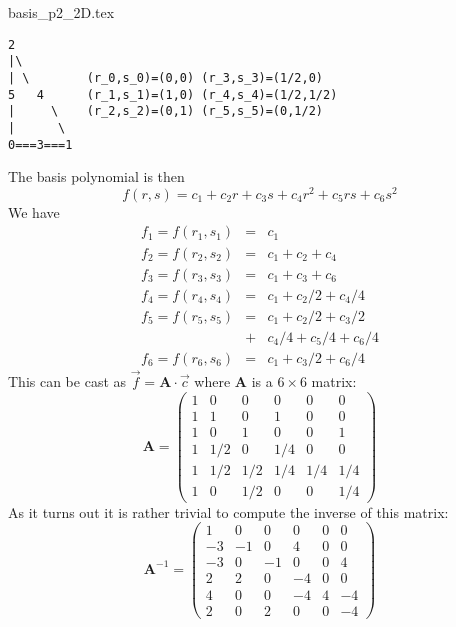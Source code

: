 \begin{flushright} {\tiny {\color{gray} basis\_p2\_2D.tex}} \end{flushright}


\begin{verbatim}
2            
|\
| \        (r_0,s_0)=(0,0) (r_3,s_3)=(1/2,0)
5   4      (r_1,s_1)=(1,0) (r_4,s_4)=(1/2,1/2)
|     \    (r_2,s_2)=(0,1) (r_5,s_5)=(0,1/2)
|      \ 
0===3===1
\end{verbatim}
The basis polynomial is then
\[
f(r,s) = c_1 + c_2 r + c_3 s + c_4  r^2 + c_5 rs  + c_6 s^2
\]
We have 
\begin{eqnarray}
f_1 = f(r_1,s_1) &=& c_1 \nonumber\\
f_2 = f(r_2,s_2) &=& c_1 + c_2 + c_4\nonumber\\
f_3 = f(r_3,s_3) &=& c_1 + c_3 + c_6\nonumber\\
f_4 = f(r_4,s_4) &=& c_1 + c_2/2 + c_4/4\nonumber\\
f_5 = f(r_5,s_5) &=& c_1 + c_2/2 + c_3/2 \nonumber\\
                 &+& c_4/4 + c_5/4 + c_6/4\nonumber\\
f_6 = f(r_6,s_6) &=& c_1 + c_3/2 + c_6/4\nonumber
\end{eqnarray}
This can be cast as $\vec{f}={\bm A}\cdot \vec{c}$ where ${\bm A}$ is a $6\times6$ matrix:
\[
{\bm A}=
\left(
\begin{array}{cccccc}
1&0   &  0  & 0   & 0   & 0\\
1&1   &  0  & 1   & 0   & 0\\
1&0   &  1  & 0   & 0   & 1\\
1&1/2 &  0  & 1/4 & 0   & 0\\
1&1/2 &  1/2& 1/4 & 1/4 & 1/4\\
1&0   &  1/2& 0   & 0   & 1/4
\end{array}
\right)
\]
As it turns out it is rather trivial to compute the inverse of this matrix:
\[
{\bm A}^{-1}=
\left(
\begin{array}{cccccc}
1  & 0 & 0  & 0  & 0 & 0  \\
-3 & -1& 0  & 4  & 0 & 0 \\
-3 & 0 & -1 & 0  & 0 & 4 \\
2  & 2 & 0  & -4 & 0 & 0  \\
4  & 0 & 0  & -4 & 4 & -4 \\
2  & 0 & 2  & 0  & 0 & -4
\end{array}
\right)
\]
